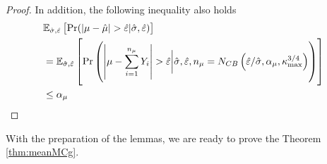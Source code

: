 \documentclass{iitthesis}
\newtheorem{lemma}[theorem]{Lemma}
\begin{document}
\begin{proof}
In addition, the following inequality also holds
\begin{align}\label{fixedwidthintervalrandomheps}
&\mathbb{E}_{\hat{\sigma},\hat{\varepsilon}}\left[\Pr({\left \lvert \mu-\hat{\mu} \right \rvert >\hat{\varepsilon}}| \hat{\sigma} , \hat{\varepsilon})\right]\\
&= \mathbb{E}_{\hat{\sigma},\hat{\varepsilon}}\left[\Pr\left({\left \lvert \mu-\sum_{i=1}^{n_\mu}Y_i \right \rvert >\hat{\varepsilon}}\bigg \vert \hat{\sigma} , \hat{\varepsilon}, n_\mu= N_{CB}\left(\hat{\varepsilon}/\hat{\sigma},\alpha_\mu, \kappa_{\max}^{3/4}\right)\right)\right]\\
&\leq \alpha_\mu
\end{align}
\end{proof}
With the preparation of the lemmas, we are ready to prove the Theorem \ref{thm:meanMCg}.
\end{document}
